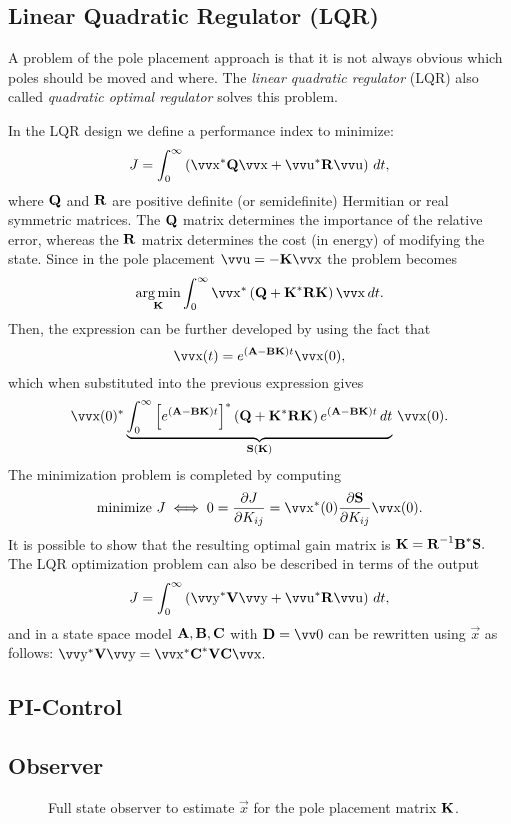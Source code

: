 \subsection{Linear Quadratic Regulator (LQR)}

A problem of the pole placement approach is that it is not always obvious which poles should be moved and where. The \emph{linear quadratic regulator} (LQR) also called \emph{quadratic optimal regulator} solves this problem.

In the LQR design we define a performance index to minimize:
\[
	J = \int_0^\infty \left(
		\vec{x}^* \mx{Q} \vec{x} + \vec{u}^* \mx{R} \vec{u}
	\right) \, dt,
\]
where \(\bm{\mathrm{Q}}\) and \(\bm{\mathrm{R}}\) are positive definite (or semidefinite) Hermitian or real symmetric matrices. The \(\bm{\mathrm{Q}}\) matrix determines the importance of the relative error, whereas the \(\bm{\mathrm{R}}\) matrix determines the cost (in energy) of modifying the state.  Since in the pole placement \(\vec{u} = -\mx{K}\vec{x}\) the problem becomes
\[
	\argmin_{\mx{K}}
	\int_0^\infty \vec{x}^* \left(
		\mx{Q} + \mx{K}^* \mx{R} \mx{K}
	\right) \vec{x} \, dt.
\]
Then, the expression can be further developed by using the fact that
\[
	\vec{x}(t) = e^{(\mx{A} - \mx{B}\mx{K}) t} \vec{x}(0),
\]
which when substituted into the previous expression gives
\[
	\vec{x}(0)^* \underbrace{\int_0^\infty \left[
			e^{(\mx{A} - \mx{B}\mx{K}) t}
		\right]^* \left(
			\mx{Q} + \mx{K}^* \mx{R} \mx{K}
		\right) e^{(\mx{A} - \mx{B}\mx{K}) t}
		\, dt}_{\mx{S}(\mx{K})}
	\, \vec{x}(0).
\]
The minimization problem is completed by computing
\[
	\text{minimize } J \iff
	0 = \frac{\partial J}{\partial K_{ij}} =
	\vec{x}^*(0) \frac{\partial \mx{S}}{\partial K_{ij}} \vec{x}(0).
\]
It is possible to show that the resulting optimal gain matrix is
\(
	\bm{\mathrm{K}} = \bm{\mathrm{R}}^{-1} \bm{\mathrm{B}}^* \bm{\mathrm{S}}.
\)
The LQR optimization problem can also be described in terms of the output
\[
	J = \int_0^\infty \left(
		\vec{y}^* \mx{V} \vec{y} + \vec{u}^* \mx{R} \vec{u}
	\right) \, dt,
\]
and in a state space model \(\bm{\mathrm{A}}, \bm{\mathrm{B}}, \bm{\mathrm{C}}\) with \(\mx{D} = \vec{0}\) can be rewritten using \(\vec{x}\) as follows:
\(
	\vec{y}^* \mx{V} \vec{y} =
	\vec{x}^* \mx{C}^* \mx{V} \mx{C} \vec{x}.
\)

\subsection{PI-Control}


\subsection{Observer}

\begin{figure}[h]
	\centering
	\resizebox{\linewidth}{!}{%
	}
	\caption{
		Full state observer to estimate \(\vec{x}\) for the pole placement matrix \(\bm{\mathrm{K}}\).
		\label{fig:ss-observer}
	}
\end{figure}

